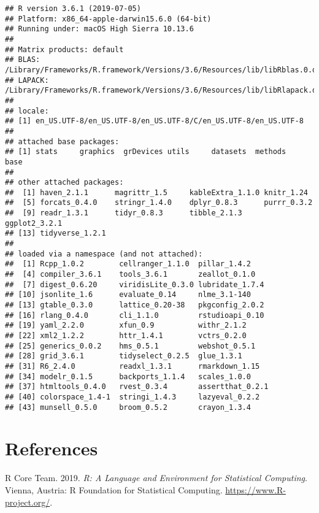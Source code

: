 \documentclass[]{article}
\begin{document}
\begin{verbatim}
## R version 3.6.1 (2019-07-05)
## Platform: x86_64-apple-darwin15.6.0 (64-bit)
## Running under: macOS High Sierra 10.13.6
## 
## Matrix products: default
## BLAS:   /Library/Frameworks/R.framework/Versions/3.6/Resources/lib/libRblas.0.dylib
## LAPACK: /Library/Frameworks/R.framework/Versions/3.6/Resources/lib/libRlapack.dylib
## 
## locale:
## [1] en_US.UTF-8/en_US.UTF-8/en_US.UTF-8/C/en_US.UTF-8/en_US.UTF-8
## 
## attached base packages:
## [1] stats     graphics  grDevices utils     datasets  methods   base     
## 
## other attached packages:
##  [1] haven_2.1.1      magrittr_1.5     kableExtra_1.1.0 knitr_1.24      
##  [5] forcats_0.4.0    stringr_1.4.0    dplyr_0.8.3      purrr_0.3.2     
##  [9] readr_1.3.1      tidyr_0.8.3      tibble_2.1.3     ggplot2_3.2.1   
## [13] tidyverse_1.2.1 
## 
## loaded via a namespace (and not attached):
##  [1] Rcpp_1.0.2        cellranger_1.1.0  pillar_1.4.2     
##  [4] compiler_3.6.1    tools_3.6.1       zeallot_0.1.0    
##  [7] digest_0.6.20     viridisLite_0.3.0 lubridate_1.7.4  
## [10] jsonlite_1.6      evaluate_0.14     nlme_3.1-140     
## [13] gtable_0.3.0      lattice_0.20-38   pkgconfig_2.0.2  
## [16] rlang_0.4.0       cli_1.1.0         rstudioapi_0.10  
## [19] yaml_2.2.0        xfun_0.9          withr_2.1.2      
## [22] xml2_1.2.2        httr_1.4.1        vctrs_0.2.0      
## [25] generics_0.0.2    hms_0.5.1         webshot_0.5.1    
## [28] grid_3.6.1        tidyselect_0.2.5  glue_1.3.1       
## [31] R6_2.4.0          readxl_1.3.1      rmarkdown_1.15   
## [34] modelr_0.1.5      backports_1.1.4   scales_1.0.0     
## [37] htmltools_0.4.0   rvest_0.3.4       assertthat_0.2.1 
## [40] colorspace_1.4-1  stringi_1.4.3     lazyeval_0.2.2   
## [43] munsell_0.5.0     broom_0.5.2       crayon_1.3.4
\end{verbatim}

\hypertarget{references}{%
\section*{References}\label{references}}

\hypertarget{refs}{}
\leavevmode\hypertarget{ref-rlang}{}%
R Core Team. 2019. \emph{R: A Language and Environment for Statistical
Computing}. Vienna, Austria: R Foundation for Statistical Computing.
\url{https://www.R-project.org/}.
\end{document}
